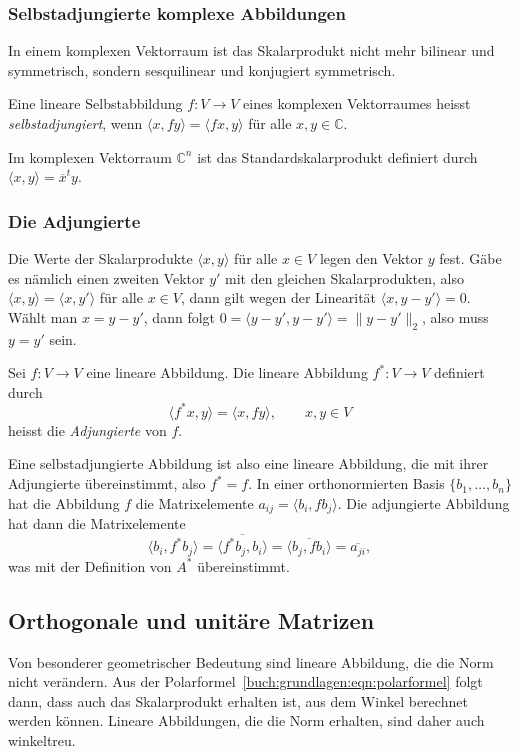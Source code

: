 \subsubsection{Selbstadjungierte komplexe Abbildungen}
In einem komplexen Vektorraum ist das Skalarprodukt nicht mehr bilinear
und symmetrisch, sondern sesquilinear und konjugiert symmetrisch.

\begin{definition}
Eine lineare Selbstabbildung $f\colon V\to V$  eines komplexen
Vektorraumes heisst {\em selbstadjungiert},
wenn $\langle x,fy\rangle=\langle fx,y\rangle$ für alle $x,y\in\mathbb{C}$.
%
\end{definition}

Im komplexen Vektorraum $\mathbb{C}^n$ ist das Standardskalarprodukt
definiert durch $\langle x,y\rangle = \overline{x}^ty$.

\subsubsection{Die Adjungierte}
Die Werte der Skalarprodukte $\langle x, y\rangle$ für alle $x\in V$
legen den Vektor $y$ fest.
Gäbe es nämlich einen zweiten Vektor $y'$ mit den gleichen Skalarprodukten,
also $\langle x,y\rangle = \langle x,y'\rangle$ für alle $x\in V$,
dann gilt wegen der Linearität $\langle x,y-y'\rangle=0$.
Wählt man $x=y-y'$, dann folgt
$0=\langle y-y',y-y'\rangle=\|y-y'\|_2$, also muss $y=y'$ sein.

\begin{definition}
Sei $f\colon V\to V$ eine lineare Abbildung.
Die lineare Abbildung $f^*\colon V\to V$ definiert durch
\[
\langle f^*x,y\rangle = \langle x,fy\rangle,\qquad x,y\in V
\]
heisst die {\em Adjungierte} von $f$.
%
\end{definition}

Eine selbstadjungierte Abbildung ist also eine lineare Abbildung,
die mit ihrer Adjungierte übereinstimmt, also $f^* = f$.
In einer orthonormierten Basis $\{b_1,\dots,b_n\}$ hat die Abbildung
$f$ die Matrixelemente $a_{i\!j}=\langle b_i,fb_j\rangle$.
Die adjungierte Abbildung hat dann die Matrixelemente
\[
\langle b_i,f^*b_j \rangle
=
\overline{\langle f^*b_j,b_i\rangle}
=
\overline{\langle b_j,fb_i\rangle}
=
\overline{a_{ji}},
\]
was mit der Definition von $A^*$ übereinstimmt.

\subsection{Orthogonale und unitäre Matrizen
\label{buch:subsection:orthogonale-und-unitaere-matrizen}}
Von besonderer geometrischer Bedeutung sind lineare Abbildung,
die die Norm nicht verändern.
Aus der Polarformel~\eqref{buch:grundlagen:eqn:polarformel}
folgt dann, dass auch das Skalarprodukt erhalten ist, aus dem
Winkel berechnet werden können.
Lineare Abbildungen, die die Norm erhalten, sind daher auch winkeltreu.

